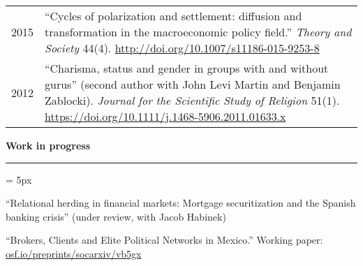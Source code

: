\documentclass[12pt,letterpaper]{article}
\renewcommand{\labelitemi}{$$}
\newcommand{\sectionhead}[1]{\begin{flushleft}\large\bf{#1}\vspace{.1cm}\hrule\end{flushleft}}
\begin{document}
\begin{tabulary}{.97\textwidth}{@{}p{2.5cm}  L}
2015 &``Cycles of polarization and settlement: diffusion and transformation in the macroeconomic policy field.'' \emph{Theory and Society} 44(4).  \url{http://doi.org/10.1007/s11186-015-9253-8}\vspace{0.2cm}\\
2012 &``Charisma, status and gender in groups with and without gurus'' (second author with John Levi Martin and Benjamin Zablocki). \emph{Journal for the Scientific Study of Religion} 51(1). \url{https://doi.org/10.1111/j.1468-5906.2011.01633.x}\vspace{0.2cm}\\
\end{tabulary}

\newpage

\sectionhead{Work in progress}
\begin{list}{\labelitemi}{\leftmargin = 5px}

\item ``Relational herding in financial markets: Mortgage securitization and the Spanish banking crisis'' (under review, with Jacob Habinek)

\item``Brokers, Clients and Elite Political Networks in Mexico.''  Working paper: \url{osf.io/preprints/socarxiv/vb5gx}




\end{list}
\end{document}
